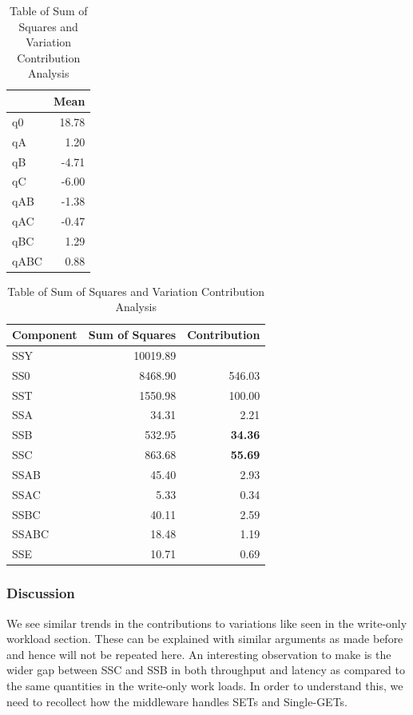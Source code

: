 \documentclass[11pt,a4paper]{article}
\begin{document}
\begin{table}[H]
	\begin{minipage}{.5\linewidth}
	\caption{Table of q values}
	\centering
	\begin{tabular}{|l|r|}
		\hline
		& \multicolumn{1}{l|}{Mean} \\ \hline
		q0 & 18.78 \\ \hline
		qA & 1.20 \\ \hline
		qB & -4.71 \\ \hline
		qC & -6.00 \\ \hline
		qAB & -1.38 \\ \hline
		qAC & -0.47 \\ \hline
		qBC & 1.29 \\ \hline
		qABC & 0.88 \\ \hline
	\end{tabular}
	\end{minipage}%
	\begin{minipage}{.5\linewidth}
	\caption{Table of Sum of Squares and Variation Contribution Analysis}
	\centering
	\begin{tabular}{|l|r|r|}
		\hline
		Component & \multicolumn{1}{l|}{Sum of Squares} & \multicolumn{1}{l|}{Contribution} \\ \hline
		SSY & 10019.89 & \multicolumn{1}{l|}{} \\ \hline
		SS0 & 8468.90 & 546.03 \\ \hline
		SST & 1550.98 & 100.00 \\ \hline
		SSA & 34.31 & 2.21 \\ \hline
		SSB & 532.95 & \textbf{34.36}\\ \hline
		SSC & 863.68 & \textbf{55.69} \\ \hline
		SSAB & 45.40 & 2.93 \\ \hline
		SSAC & 5.33 & 0.34 \\ \hline
		SSBC & 40.11 & 2.59 \\ \hline
		SSABC & 18.48 & 1.19 \\ \hline
		SSE & 10.71 & 0.69 \\ \hline
	\end{tabular}
	\end{minipage} 
\end{table}

\subsubsection{Discussion}
We see similar trends in the contributions to variations like seen in the write-only workload section. These can be explained with similar arguments as made before and hence will not be repeated here. An interesting observation to make is the wider gap between SSC and SSB in both throughput and latency as compared to the same quantities in the write-only work loads. In order to understand this, we need to recollect how the middleware handles SETs and Single-GETs. 
\end{document}
